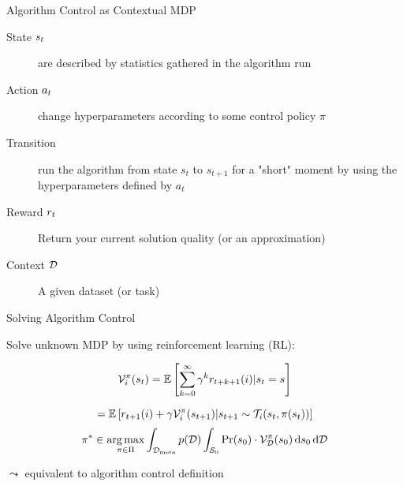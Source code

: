 \begin{frame}[c]{Algorithm Control as Contextual MDP }


\begin{description}
	\item[State $s_t$] are described by statistics gathered in the algorithm run
	\pause
	\item[Action $a_t$] change hyperparameters according to some control policy $\pi$
	\pause
	\item[Transition] run the algorithm from state $s_t$ to $s_{t+1}$ for a "short" moment by using the hyperparameters defined by $a_t$
	\pause
	\item[Reward $r_t$] Return your current solution quality (or an approximation)
	\pause
	\item[Context $\mathcal{D}$] A given dataset (or task)
\end{description}

\bigskip
	
\centering

	
	
\end{frame}
\begin{frame}[c]{Solving Algorithm Control}

Solve unknown MDP by using reinforcement learning (RL):

\begin{equation}
\mathcal{V}_i^\pi(s_t) =  \mathbb{E} \left[\sum_{k=0}^\infty\gamma^k r_{t+k+1}(i)| s_t=s \right]\nonumber
\end{equation}
\pause

\begin{equation}
 = \mathbb{E} \left[ r_{t+1}(i)+\gamma\mathcal{V}_i^\pi(s_{t+1})| s_{t+1} \sim \mathcal{T}_i(s_t, \pi(s_t)) \right] \nonumber
\end{equation}
\pause
\begin{equation}
\pi^* \in
\operatorname*{arg\,max}_{\pi \in \Pi}
\int_{\mathcal{D}_{\text{meta}}} p(\mathcal{D}) \int_{\mathcal{S}_0} \Pr(s_0) \cdot \mathcal{V}^\pi_{\mathcal{D}}(s_0) \mathop{}\!\mathrm{d} s_0 \mathop{}\!\mathrm{d} \mathcal{D} \nonumber
\end{equation}

\bigskip
\pause
$\leadsto$ equivalent to algorithm control definition


\end{frame}
